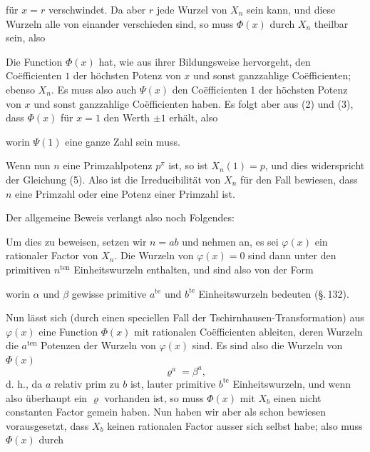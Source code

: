 
für $x = r$ verschwindet. Da aber $r$ jede Wurzel von $X_n$ sein kann, und
diese Wurzeln alle von einander verschieden sind, so muss $\varPhi(x)$ durch
$X_n$ theilbar sein, also


Die Function $\varPhi(x)$ hat, wie aus ihrer Bildungsweise hervorgeht, den
Co\"efficienten $1$ der höchsten Potenz von $x$ und sonst ganzzahlige
Co\"efficienten; ebenso $X_n$. Es muss also auch $\varPsi(x)$ den
Co\"efficienten $1$ der höchsten Potenz von $x$ und sonst ganzzahlige
Co\"efficienten haben. Es folgt aber aus (2) und (3), dass $\varPhi(x)$ für
$x = 1$ den Werth $\pm 1$ erhält, also


worin $\varPsi(1)$ eine ganze Zahl sein muss.

Wenn nun $n$ eine Primzahlpotenz $p^{\pi}$ ist, so ist $X_n(1) = p$, und dies
widerspricht der Gleichung (5). Also ist die Irreducibilität von $X_n$ für
den Fall bewiesen, dass $n$ eine Primzahl oder eine Potenz einer Primzahl
ist.

Der allgemeine Beweis verlangt also noch Folgendes: 

Um dies zu beweisen, setzen wir $n = ab$ und nehmen an, es sei $\varphi(x)$
ein rationaler Factor von $X_n$. Die Wurzeln von $\varphi(x) = 0$ sind dann
unter den primitiven $n^{\mathrm{ten}}$ Einheitswurzeln enthalten, und sind
also von der Form


worin $\alpha$ und $\beta$ gewisse primitive $a^{\mathrm{te}}$ und
$b^{\mathrm{te}}$ Einheitswurzeln bedeuten (\S.\,132).

Nun lässt sich (durch einen speciellen Fall der Tschirnhausen-Transformation)
aus $\varphi(x)$ eine Function $\varPhi(x)$ mit rationalen Co\"efficienten
ableiten, deren Wurzeln die $a^{\mathrm{ten}}$ Potenzen der Wurzeln von
$\varphi(x)$ sind. Es sind also die Wurzeln von $\varPhi(x)$
\[
\varrho^a = \beta^a,
\]
d. h., da $a$ relativ prim zu $b$ ist, lauter primitive $b^{\mathrm{te}}$
Einheitswurzeln, und wenn also überhaupt ein $\varrho$ vorhanden ist, so muss
$\varPhi(x)$ mit $X_b$ einen nicht constanten Factor gemein haben. Nun haben
wir aber als schon bewiesen vorausgesetzt, dass $X_b$ keinen rationalen
Factor ausser sich selbst habe; also muss $\varPhi(x)$ durch
